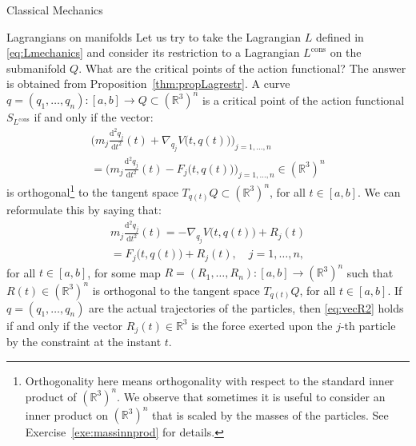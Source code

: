 \documentclass[oneside,a4paper,11pt]{amsbook}
\newcommand{\R}{\mathds R}
\newcommand{\dd}{\mathrm d}
\theoremstyle{remark}\newtheorem{exercise}{Exercise}[chapter]
\theoremstyle{plain}\newtheorem{teo}{Theorem}[section]
\theoremstyle{plain}\newtheorem{lem}[teo]{Lemma}
\theoremstyle{plain}\newtheorem{prop}[teo]{Proposition}
\theoremstyle{plain}\newtheorem{cor}[teo]{Corollary}
\theoremstyle{definition}\newtheorem{defin}[teo]{Definition}
\theoremstyle{remark}\newtheorem{rem}[teo]{Remark}
\theoremstyle{definition}\newtheorem{notation}[teo]{Notation}
\theoremstyle{definition}\newtheorem{convention}[teo]{Convention}
\theoremstyle{definition}\newtheorem{example}[teo]{Example}
\numberwithin{section}{chapter}
\numberwithin{equation}{section}
\begin{document}
\begin{chapter}{Classical Mechanics}
\begin{section}{Lagrangians on manifolds}
Let us try to take the Lagrangian $L$ defined in \eqref{eq:Lmechanics} and consider its restriction to
a Lagrangian $L^{\mathrm{cons}}$ on the submanifold $Q$. What are the critical points of the action functional?
The answer is obtained from Proposition~\ref{thm:propLagrestr}. A curve $q=(q_1,\ldots,q_n):[a,b]\to Q\subset(\R^3)^n$
is a critical point of the action functional $S_{L^{\mathrm{cons}}}$ if and only if the vector:
\begin{multline}\label{eq:vecR}
\Big(m_j\frac{\dd^2q_j}{\dd t^2}(t)+\nabla_{q_j}V\big(t,q(t)\big)\!\Big)_{\!j=1,\ldots,n}\\[5pt]
=\Big(m_j\frac{\dd^2q_j}{\dd t^2}(t)-F_j\big(t,q(t)\big)\!\Big)_{\!j=1,\ldots,n}\in(\R^3)^n
\end{multline}
is orthogonal\footnote{%
Orthogonality here means orthogonality with respect to the standard inner product of $(\R^3)^n$. We observe that sometimes
it is useful to consider an inner product on $(\R^3)^n$ that is scaled by the masses of the particles. See
Exercise~\ref{exe:massinnprod} for details.} to the tangent space $T_{q(t)}Q\subset(\R^3)^n$, for all $t\in[a,b]$.
We can reformulate this by saying that:
\begin{multline}\label{eq:vecR2}
m_j\frac{\dd^2q_j}{\dd t^2}(t)=-\nabla_{q_j}V\big(t,q(t)\big)+R_j(t)\\
=F_j\big(t,q(t)\big)+R_j(t),\quad j=1,\ldots,n,
\end{multline}
for all $t\in[a,b]$, for some map $R=(R_1,\ldots,R_n):[a,b]\to(\R^3)^n$ such that
$R(t)\in(\R^3)^n$ is orthogonal to the tangent space $T_{q(t)}Q$, for all $t\in[a,b]$.
If $q=(q_1,\ldots,q_n)$ are the actual trajectories of the particles, then \eqref{eq:vecR2} holds if and only if
the vector $R_j(t)\in\R^3$ is the force exerted upon the $j$-th particle by the constraint at the instant $t$.


\end{section}
\end{chapter}
\end{document}
